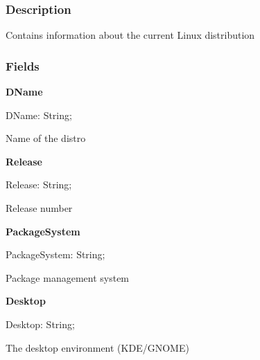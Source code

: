 \documentclass{report}
\newif\ifpdf
\begin{document}
\subsubsection*{\large{\textbf{Description}}\normalsize\hspace{1ex}\hfill}
Contains information about the current Linux distribution\subsubsection*{\large{\textbf{Fields}}\normalsize\hspace{1ex}\hfill}
\begin{list}{}{
\setlength{\itemindent}{0cm}
\setlength{\listparindent}{0cm}
\setlength{\leftmargin}{\evensidemargin}
\addtolength{\leftmargin}{\tmplength}
\settowidth{\labelsep}{X}
\addtolength{\leftmargin}{\labelsep}
\setlength{\labelwidth}{\tmplength}
}
\label{distri.TDistroInfo-DName}
\item[\textbf{DName}\hfill]
\ifpdf
\begin{flushleft}
\fi
\begin{ttfamily}
DName: String;\end{ttfamily}

\ifpdf
\end{flushleft}
\fi


\par Name of the distro\label{distri.TDistroInfo-Release}
\item[\textbf{Release}\hfill]
\ifpdf
\begin{flushleft}
\fi
\begin{ttfamily}
Release: String;\end{ttfamily}

\ifpdf
\end{flushleft}
\fi


\par Release number\label{distri.TDistroInfo-PackageSystem}
\item[\textbf{PackageSystem}\hfill]
\ifpdf
\begin{flushleft}
\fi
\begin{ttfamily}
PackageSystem: String;\end{ttfamily}

\ifpdf
\end{flushleft}
\fi


\par Package management system\label{distri.TDistroInfo-Desktop}
\item[\textbf{Desktop}\hfill]
\ifpdf
\begin{flushleft}
\fi
\begin{ttfamily}
Desktop: String;\end{ttfamily}

\ifpdf
\end{flushleft}
\fi


\par The desktop environment (KDE/GNOME)\end{list}
\end{document}
